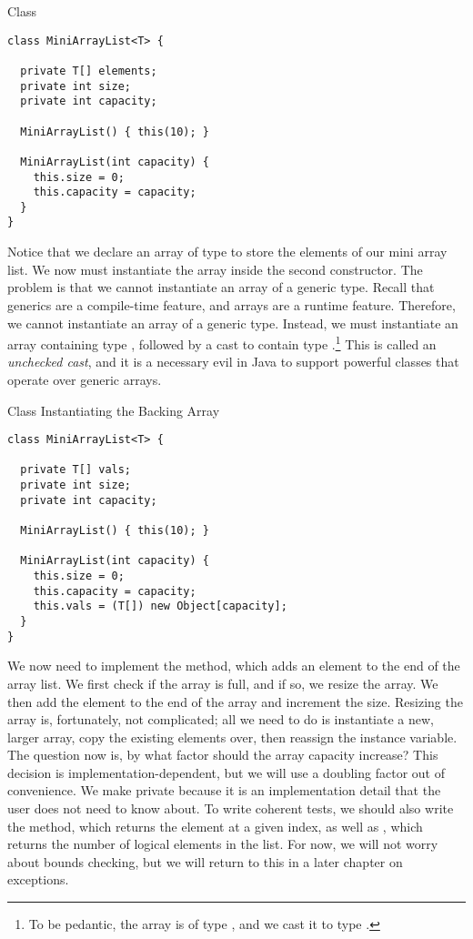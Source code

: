 \begin{cl}[]{ Class}
\begin{lstlisting}[language=MyJava]
class MiniArrayList<T> {

  private T[] elements;
  private int size;
  private int capacity;

  MiniArrayList() { this(10); }

  MiniArrayList(int capacity) {
    this.size = 0;
    this.capacity = capacity;
  }
}
\end{lstlisting}
\end{cl}

Notice that we declare an array of type  to store the elements of our mini array list. We now must instantiate the array inside the second constructor. The problem is that we cannot instantiate an array of a generic type. Recall that generics are a compile-time feature, and arrays are a runtime feature. Therefore, we cannot instantiate an array of a generic type. Instead, we must instantiate an array containing type , followed by a cast to contain type .\footnote{To be pedantic, the array is of type , and we cast it to type .} This is called an \emph{unchecked cast}, and it is a necessary evil in Java to support powerful classes that operate over generic arrays.

\begin{cl}[]{ Class Instantiating the Backing Array}
\begin{lstlisting}[language=MyJava]
class MiniArrayList<T> {

  private T[] vals;
  private int size;
  private int capacity;

  MiniArrayList() { this(10); }

  MiniArrayList(int capacity) {
    this.size = 0;
    this.capacity = capacity;
    this.vals = (T[]) new Object[capacity];
  }
}
\end{lstlisting}
\end{cl}

We now need to implement the  method, which adds an element to the end of the array list. We first check if the array is full, and if so, we resize the array. We then add the element to the end of the array and increment the size. Resizing the array is, fortunately, not complicated; all we need to do is instantiate a new, larger array, copy the existing elements over, then reassign the instance variable. The question now is, by what factor should the array capacity increase? This decision is implementation-dependent, but we will use a doubling factor out of convenience. We make  private because it is an implementation detail that the user does not need to know about. To write coherent tests, we should also write the  method, which returns the element at a given index, as well as , which returns the number of logical elements in the list. For now, we will not worry about bounds checking, but we will return to this in a later chapter on exceptions.

